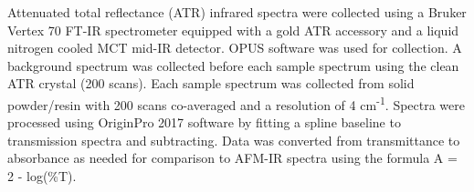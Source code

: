 Attenuated total reflectance (ATR) infrared spectra were collected using a Bruker Vertex 70 FT-IR spectrometer equipped with a gold ATR accessory and a liquid nitrogen cooled MCT mid-IR detector. OPUS software was used for collection. A background spectrum was collected before each sample spectrum using the clean ATR crystal (200 scans). Each sample spectrum was collected from solid powder/resin with 200 scans co-averaged and a resolution of 4 cm\textsuperscript{-1}. Spectra were processed using OriginPro 2017 software by fitting a spline baseline to transmission spectra and subtracting. Data was converted from transmittance to absorbance as needed for comparison to AFM-IR spectra using the formula A = 2 - log(\%T).


